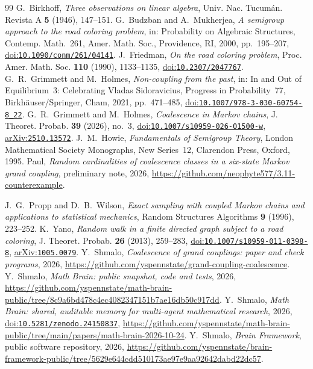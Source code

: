 \documentclass[11pt]{amsart}
\theoremstyle{remark}
\newcommand{\doi}[1]{\href{https://doi.org/#1}{doi:\nolinkurl{#1}}}
\newcommand{\arxiv}[1]{\href{https://arxiv.org/abs/#1}{arXiv:\nolinkurl{#1}}}
\begin{document}
\begin{thebibliography}{99}
 G.~Birkhoff, \emph{Three observations on linear algebra}, Univ. Nac. Tucum\'an. Revista A \textbf{5}
(1946), 147--151.
 G.~Budzban and A.~Mukherjea, \emph{A semigroup approach to the road coloring problem}, in: Probability
on Algebraic Structures, Contemp. Math.~261, Amer. Math. Soc., Providence, RI, 2000, pp.~195--207,
\doi{10.1090/conm/261/04141}.
 J.~Friedman, \emph{On the road coloring problem}, Proc. Amer. Math. Soc. \textbf{110} (1990),
1133--1135, \doi{10.2307/2047767}.
 G.~R.~Grimmett and M.~Holmes, \emph{Non-coupling from the past}, in: In and Out of Equilibrium~3:
Celebrating Vladas Sidoravicius, Progress in Probability~77, Birkh\"auser/Springer, Cham, 2021, pp.~471--485,
\doi{10.1007/978-3-030-60754-8_22}.
 G.~R.~Grimmett and M.~Holmes, \emph{Coalescence in Markov chains}, J. Theoret. Probab. \textbf{39} (2026), no.~3,
\doi{10.1007/s10959-026-01500-w}, \arxiv{2510.13572}.
 J.~M.~Howie, \emph{Fundamentals of Semigroup Theory}, London Mathematical Society Monographs, New
Series~12, Clarendon Press, Oxford, 1995.
 Paul, \emph{Random cardinalities of coalescence classes in a six-state Markov grand coupling},
preliminary note, 2026, \url{https://github.com/neophyte577/3.11-counterexample}.

 J.~G.~Propp and D.~B.~Wilson, \emph{Exact sampling with coupled Markov chains and applications to
statistical mechanics}, Random Structures Algorithms \textbf{9} (1996), 223--252.
 K.~Yano, \emph{Random walk in a finite directed graph subject to a road coloring}, J. Theoret.
Probab. \textbf{26} (2013), 259--283, \doi{10.1007/s10959-011-0398-8}, \arxiv{1005.0079}.
 Y.~Shmalo, \emph{Coalescence of grand couplings: paper and check programs}, 2026,
\url{https://github.com/yspennstate/grand-coupling-coalescence}.
 Y.~Shmalo, \emph{Math Brain: public snapshot, code and tests}, 2026,
\url{https://github.com/yspennstate/math-brain-public/tree/8c9a6bd478c4ec4082347151b7ae16db50c917dd}.
 Y.~Shmalo, \emph{Math Brain: shared, auditable memory for multi-agent mathematical research},
2026, \doi{10.5281/zenodo.24150837},
\url{https://github.com/yspennstate/math-brain-public/tree/main/papers/math-brain-2026-10-24}.
 Y.~Shmalo, \emph{Brain Framework}, public software repository, 2026,
\url{https://github.com/yspennstate/brain-framework-public/tree/5629e644cdd510173ae97e9aa92642dabd22dc57}.
\end{thebibliography}
\end{document}
